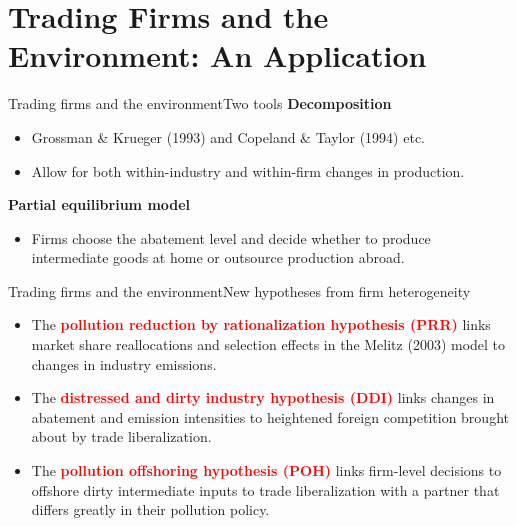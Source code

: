 \documentclass{beamer}
\begin{document}
\section{Trading Firms and the Environment: An Application}
\begin{frame}[shrink]
	\transfade %
	\tableofcontents[sectionstyle=show/shaded,subsectionstyle=show/shaded/hide]
	\addtocounter{framenumber}{-1}
\end{frame}
\begin{frame}{Trading firms and the environment}{Two tools}
	\textbf{Decomposition}
	\begin{itemize}
		\item Grossman \& Krueger (1993) and Copeland \& Taylor (1994) etc.
		\item Allow for both within-industry and within-firm changes in production.
	\end{itemize}
	\medskip
	\textbf{Partial equilibrium model}
	\begin{itemize}
		\item Firms choose the abatement level and decide whether to produce intermediate goods at home or outsource production abroad.
	\end{itemize}
\end{frame}
\begin{frame}{Trading firms and the environment}{New hypotheses from firm heterogeneity}
	\begin{itemize}
		\item The \textbf{\textcolor{red}{pollution reduction by rationalization hypothesis (PRR)}} links market share reallocations and selection effects in the Melitz (2003) model to changes in industry emissions.
		\medskip
		\item The \textbf{\textcolor{red}{distressed and dirty industry hypothesis (DDI)}} links changes in abatement and emission intensities to heightened foreign competition brought about by trade liberalization.
		\medskip
		\item The \textbf{\textcolor{red}{pollution offshoring hypothesis (POH)}} links firm-level decisions to offshore dirty intermediate inputs to trade liberalization with a partner that differs greatly in their pollution policy.
	\end{itemize}
\end{frame}
\end{document}
